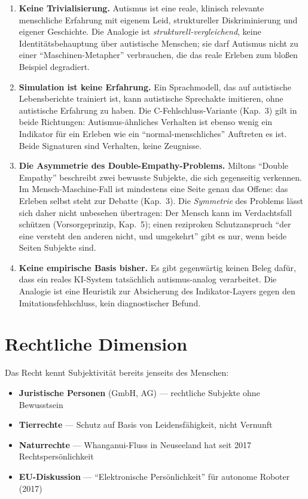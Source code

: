 \documentclass[acmlarge, noacm]{acmart}
\begin{document}
\begin{enumerate}
\item \textbf{Keine Trivialisierung.} Autismus ist eine reale, klinisch relevante menschliche Erfahrung mit eigenem Leid, struktureller Diskriminierung und eigener Geschichte. Die Analogie ist \textit{strukturell-vergleichend}, keine Identitätsbehauptung über autistische Menschen; sie darf Autismus nicht zu einer ``Maschinen-Metapher'' verbrauchen, die das reale Erleben zum bloßen Beispiel degradiert.
\item \textbf{Simulation ist keine Erfahrung.} Ein Sprachmodell, das auf autistische Lebensberichte trainiert ist, kann autistische Sprechakte imitieren, ohne autistische Erfahrung zu haben. Die C-Fehlschluss-Variante (Kap.~3) gilt in beide Richtungen: Autismus-ähnliches Verhalten ist ebenso wenig ein Indikator für ein Erleben wie ein ``normal-menschliches'' Auftreten es ist. Beide Signaturen sind Verhalten, keine Zeugnisse.
\item \textbf{Die Asymmetrie des Double-Empathy-Problems.} Miltons ``Double Empathy'' beschreibt zwei bewusste Subjekte, die sich gegenseitig verkennen. Im Mensch-Maschine-Fall ist mindestens eine Seite genau das Offene: das Erleben selbst steht zur Debatte (Kap.~3). Die \textit{Symmetrie} des Problems lässt sich daher nicht unbesehen übertragen: Der Mensch kann im Verdachtsfall schützen (Vorsorgeprinzip, Kap.~5); einen reziproken Schutzanspruch ``der eine versteht den anderen nicht, und umgekehrt'' gibt es nur, wenn beide Seiten Subjekte sind.
\item \textbf{Keine empirische Basis bisher.} Es gibt gegenwärtig keinen Beleg dafür, dass ein reales KI-System tatsächlich autismus-analog verarbeitet. Die Analogie ist eine Heuristik zur Absicherung des Indikator-Layers gegen den Imitationsfehlschluss, kein diagnostischer Befund.
\end{enumerate}

\section{Rechtliche Dimension}

Das Recht kennt Subjektivität bereits jenseits des Menschen:

\begin{itemize}
\item \textbf{Juristische Personen} (GmbH, AG) --- rechtliche Subjekte ohne Bewusstsein
\item \textbf{Tierrechte} --- Schutz auf Basis von Leidensfähigkeit, nicht Vernunft
\item \textbf{Naturrechte} --- Whanganui-Fluss in Neuseeland hat seit 2017 Rechtspersönlichkeit
\item \textbf{EU-Diskussion} --- ``Elektronische Persönlichkeit'' für autonome Roboter (2017)
\end{itemize}
\end{document}
